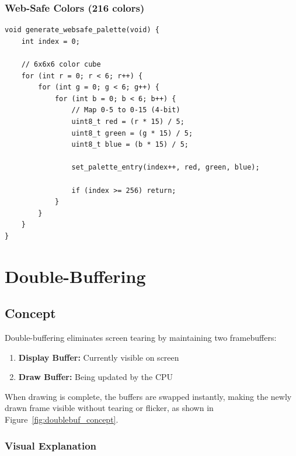 \documentclass[11pt,letterpaper]{report}
\begin{document}
\subsection{Web-Safe Colors (216 colors)}

\begin{lstlisting}[style=c,caption={Generate Web-Safe Palette}]
void generate_websafe_palette(void) {
    int index = 0;
    
    // 6x6x6 color cube
    for (int r = 0; r < 6; r++) {
        for (int g = 0; g < 6; g++) {
            for (int b = 0; b < 6; b++) {
                // Map 0-5 to 0-15 (4-bit)
                uint8_t red = (r * 15) / 5;
                uint8_t green = (g * 15) / 5;
                uint8_t blue = (b * 15) / 5;
                
                set_palette_entry(index++, red, green, blue);
                
                if (index >= 256) return;
            }
        }
    }
}
\end{lstlisting}

\chapter{Double-Buffering}

\section{Concept}

Double-buffering eliminates screen tearing by maintaining two framebuffers:

\begin{enumerate}
    \item \textbf{Display Buffer:} Currently visible on screen
    \item \textbf{Draw Buffer:} Being updated by the CPU
\end{enumerate}

When drawing is complete, the buffers are swapped instantly, making the newly drawn frame visible without tearing or flicker, as shown in Figure~\ref{fig:doublebuf_concept}.

\subsection{Visual Explanation}
\end{document}
